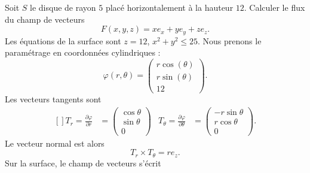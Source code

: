 \begin{example}
	Soit \( S\) le disque de rayon \( 5\) placé horizontalement à la hauteur \( 12\). Calculer le flux du champ de vecteurs
	\begin{equation}
		F(x,y,z)=xe_x+ye_y+ze_z.
	\end{equation}
	Les équations de la surface sont \( z=12\), \( x^2+y^2\leq 25\). Nous prenons le paramétrage en coordonnées cylindriques :
	\begin{equation}
		\varphi(r,\theta)=\begin{pmatrix}
			r\cos(\theta) \\
			r\sin(\theta) \\
			12
		\end{pmatrix}.
	\end{equation}
	Les vecteurs tangents sont
	\begin{equation}
		\begin{aligned}[]
			T_r=\frac{ \partial \varphi }{ \partial r } & =\begin{pmatrix}
				                                               \cos\theta \\
				                                               \sin\theta \\
				                                               0
			                                               \end{pmatrix} & T_{\theta}=\frac{ \partial \varphi }{ \partial \theta } & =\begin{pmatrix}
				                                                                                                                          -r\sin\theta \\
				                                                                                                                          r\cos\theta  \\
				                                                                                                                          0
			                                                                                                                          \end{pmatrix}.
		\end{aligned}
	\end{equation}
	Le vecteur normal est alors
	\begin{equation}
		T_r\times T_{\theta}=re_z.
	\end{equation}
	Sur la surface, le champ de vecteurs s'écrit
	\begin{equation}

\end{equation}
\end{example}
